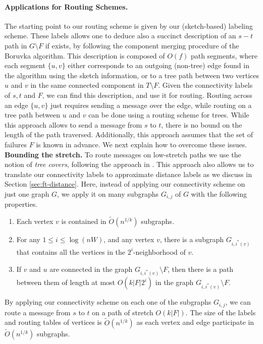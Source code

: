 \paragraph{Applications for Routing Schemes.} The starting point to our routing scheme is given by our (sketch-based) labeling scheme. These labels allows one to deduce also a succinct description of an $s-t$ path in $G \setminus F$ if exists, by following the component merging procedure of the Boruvka algorithm. This description is composed of $O(f)$ path segments, where each segment $\{u,v\}$ either corresponds to an outgoing (non-tree) edge found in the algorithm using the sketch information, or to a tree path between two vertices $u$ and $v$ in the same connected component in $T \setminus F$. Given the connectivity labels of $s,t$ and $F$, we can find this description, and use it for routing. Routing across an edge $\{u,v\}$ just requires sending a message over the edge, while routing on a tree path between $u$ and $v$ can be done using a routing scheme for trees. 
While this approach allows to send a message from $s$ to $t$, there is no bound on the length of the path traversed. Additionally, this approach assumes that the set of failures $F$ is known in advance. We next explain how to overcome these issues.
\\
\noindent\textbf{Bounding the stretch.} To route messages on low-stretch paths we use the notion of \emph{tree covers}, following the approach in \cite{chechik2012f}. This approach also allows us to translate our connectivity labels to approximate distance labels as we discuss in Section \ref{sec:ft-distance}. Here, instead of applying our connectivity scheme on just one graph $G$, we apply it on many subgraphs $G_{i,j}$ of $G$ with the following properties. 
\begin{enumerate}
\item Each vertex $v$ is contained in $\widetilde{O}(n^{1/k})$ subgraphs.
\item For any $1 \leq i \leq \log(nW)$, and any vertex $v$, there is a subgraph $G_{i,i^*(v)}$ that contains all the vertices in the $2^i$-neighborhood of $v$.
\item If $v$ and $u$ are connected in the graph $G_{i,i^*(v)} \setminus F$, then there is a path between them of length at most $O(k|F| 2^i)$ in the graph $G_{i,i^*(v)} \setminus F$.\label{prop_path}
\end{enumerate}
By applying our connectivity scheme on each one of the subgraphs $G_{i,j}$, we can route a message from $s$ to $t$ on a path of stretch $O(k|F|)$. The size of the labels and routing tables of vertices is $\widetilde{O}(n^{1/k})$ as each vertex and edge participate in $\widetilde{O}(n^{1/k})$ subgraphs.
